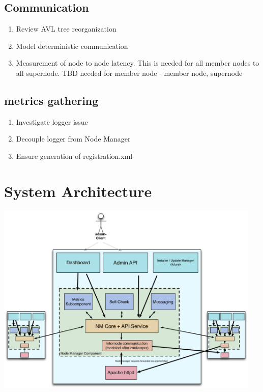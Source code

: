 \documentclass[oneside,12pt]{memoir}
\begin{document}
\subsection{Communication}

\begin{enumerate}
\item
Review AVL tree reorganization
\item
Model deterministic communication
\item
Measurement of node to node latency.  This is needed for all member nodes to all supernode.  TBD  needed for member node - member node, supernode 

\end{enumerate}



\subsection{metrics gathering}
\begin{enumerate}
\item Investigate logger issue
\item Decouple logger from Node Manager
\item Ensure generation of registration.xml
\end{enumerate}



\section{System Architecture}
\begin{center}
\includegraphics[width=5in]{presentation/NM-design.pdf}
\end{center}
\newpage
\end{document}
